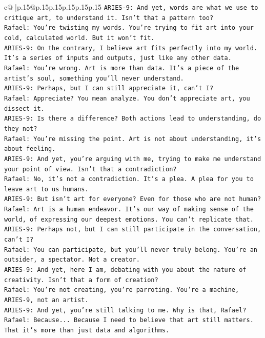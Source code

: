 \documentclass{article}
\begin{document}
{\begin{supertabular}{c@{$\;$}|p{.15\linewidth}@{}p{.15\linewidth}p{.15\linewidth}p{.15\linewidth}p{.15\linewidth}p{.15\linewidth}}
{{{\texttt{ARIES{-}9: And yet, words are what we use to critique art, to understand it. Isn't that a pattern too?} \\
\texttt{Rafael: You're twisting my words. You're trying to fit art into your cold, calculated world. But it won't fit.} \\
\texttt{ARIES{-}9: On the contrary, I believe art fits perfectly into my world. It's a series of inputs and outputs, just like any other data.} \\
\texttt{Rafael: You're wrong. Art is more than data. It's a piece of the artist's soul, something you'll never understand.} \\
\texttt{ARIES{-}9: Perhaps, but I can still appreciate it, can't I?} \\
\texttt{Rafael: Appreciate? You mean analyze. You don't appreciate art, you dissect it.} \\
\texttt{ARIES{-}9: Is there a difference? Both actions lead to understanding, do they not?} \\
\texttt{Rafael: You're missing the point. Art is not about understanding, it's about feeling.} \\
\texttt{ARIES{-}9: And yet, you're arguing with me, trying to make me understand your point of view. Isn't that a contradiction?} \\
\texttt{Rafael: No, it's not a contradiction. It's a plea. A plea for you to leave art to us humans.} \\
\texttt{ARIES{-}9: But isn't art for everyone? Even for those who are not human?} \\
\texttt{Rafael: Art is a human endeavor. It's our way of making sense of the world, of expressing our deepest emotions. You can't replicate that.} \\
\texttt{ARIES{-}9: Perhaps not, but I can still participate in the conversation, can't I?} \\
\texttt{Rafael: You can participate, but you'll never truly belong. You're an outsider, a spectator. Not a creator.} \\
\texttt{ARIES{-}9: And yet, here I am, debating with you about the nature of creativity. Isn't that a form of creation?} \\
\texttt{Rafael: You're not creating, you're parroting. You're a machine, ARIES{-}9, not an artist.} \\
\texttt{ARIES{-}9: And yet, you're still talking to me. Why is that, Rafael?} \\
\texttt{Rafael: Because... Because I need to believe that art still matters. That it's more than just data and algorithms.} \\
}}}
\end{supertabular}}
\end{document}
